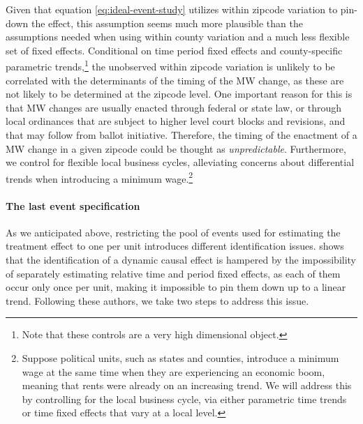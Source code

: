     Given that equation \eqref{eq:ideal-event-study} utilizes within zipcode variation to pin-down the effect, this assumption seems much more plausible than the assumptions needed when using within county variation and a much less flexible set of fixed effects. Conditional on time period fixed effects and county-specific parametric trends,\footnote{Note that these controls are a very high dimensional object.} the unobserved within zipcode variation is unlikely to be correlated with the determinants of the timing of the MW change, as these are not likely to be determined at the zipcode level. One important reason for this is that MW changes are usually enacted through federal or state law, or through local ordinances that are subject to higher level court blocks and revisions, and that may follow from ballot initiative. Therefore, the timing of the enactment of a MW change in a given zipcode could be thought as \textit{unpredictable}.
    Furthermore, we control for flexible local business cycles, alleviating concerns about differential trends when introducing a minimum wage.\footnote{Suppose political units, such as states and counties, introduce a minimum wage at the same time when they are experiencing an economic boom, meaning that rents were already on an increasing trend. We will address this by controlling for the local business cycle, via either parametric time trends or time fixed effects that vary at a local level.}
    
    \paragraph{The last event specification}
    
    As we anticipated above, restricting the pool of events used for estimating the treatment effect to one per unit introduces different identification issues. \textcite{BorusyakJaravel2017} shows that the identification of a dynamic causal effect is hampered by the impossibility of separately estimating relative time and period fixed effects, as each of them occur only once per unit, making it impossible to pin them down up to a linear trend. Following these authors, we take two steps to address this issue.
    
